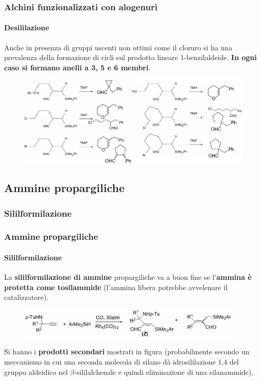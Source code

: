 \begin{frame}\frametitle{Alchini funzionalizzati con alogenuri}\framesubtitle{Desililazione}
Anche in presenza di gruppi uscenti non ottimi come il cloruro si ha una prevalenza della formazione di cicli sul prodotto lineare 1-benzilaldeide. {\bf In ogni caso si formano anelli a 3, 5 e 6 membri}.
 \begin{figure}{\includegraphics[width=1\textwidth]{img/substrati/alogenuri3.png}}\end{figure}

\end{frame}




\subsection{Ammine propargiliche}
\subsubsection{Sililformilazione}\begin{frame}\frametitle{Ammine propargiliche}\framesubtitle{Sililformilazione}
La {\bf sililformilazione di ammine} propargiliche va a buon fine se l'{\bf ammina è protetta come tosilammide} (l'ammina libera potrebbe avvelenare il catalizzatore).
\begin{figure}{\includegraphics[width=0.95\textwidth]{img/substrati/ammine-sililform.png}}\end{figure}
Si hanno i {\bf prodotti secondari} mostrati in figura (probabilmente secondo un meccanismo in cui una seconda molecola di silano dà idrosililazione 1,4 del gruppo aldeidico nel $\beta$-sililalchenale e quindi eliminazione di una silanammide).


\end{frame}

